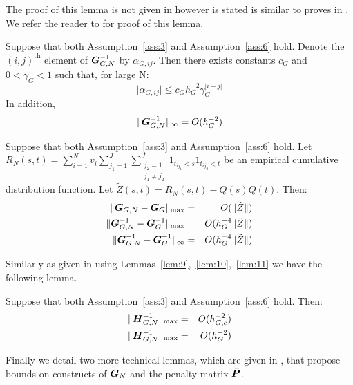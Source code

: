 The proof of this lemma is not given in \citep{xiao_asymptotic_2020} however is stated is similar to proves in \citep{xiao_asymptotic_2019}. 
We refer the reader to \citep{xiao_asymptotic_2019} for proof of this lemma. 
\begin{lemma}
	Suppose that both Assumption~\ref{ass:3} and Assumption~\ref{ass:6} hold.
	Denote the $(i,j)^\text{th}$ element of $\bm{{G}}_{G, N}^{-1}$ by $\alpha_{G, ij}$.
	Then there exists constants $c_G$ and $0 < \gamma_G < 1$ such that, for large N:
	\begin{equation}
		\lvert \alpha_{G, ij} \rvert \leq c_G h_{G}^{-2} \gamma_{G}^{\lvert i -j \rvert}
	\end{equation}
	In addition,
	\begin{equation}
		\lVert \bm{{G}}_{G, N}^{-1} \rVert_\infty = O(h_G^{-2})
	\end{equation}
	\label{lem:10}
\end{lemma}
\begin{lemma}
	Suppose that both Assumption~\ref{ass:3} and Assumption~\ref{ass:6} hold.
	Let $R_N(s,t) = \sum_{i=1}^N v_i  \sum_{j_1=1}^J \sum_{\substack{j_2=1 \\ j_1 \ne j_2}}^J 1_{t_{ij_1}< s} 1_{t_{ij_2} < t}$ be an empirical cumulative distribution function.
	Let $\tilde{Z}(s,t) = R_N(s,t) - Q(s)Q(t)$.
	Then:
	\begin{eqnarray}
		\lVert \bm{{G}}_{G,N} - \bm{{G}}_{G} \rVert_\text{max} &=& O(\lVert \tilde{Z} \rVert) \\
		\lVert \bm{{G}}_{G,N}^{-1} - \bm{{G}}_{G}^{-1} \rVert_\text{max} &=& O(h_G^{-4}\lVert \tilde{Z} \rVert) \\
		\lVert \bm{{G}}_{G,N}^{-1} - \bm{{G}}_{G}^{-1} \rVert_\infty &=& O(h_G^{-4}\lVert \tilde{Z} \rVert)
	\end{eqnarray}
	\label{lem:11} 
\end{lemma}
Similarly as given in \citep{xiao_asymptotic_2020} using Lemmas~\ref{lem:9},~\ref{lem:10},~\ref{lem:11} we have the following lemma.
\begin{lemma}
	Suppose that both Assumption~\ref{ass:3} and Assumption~\ref{ass:6} hold.
	Then:
	\begin{eqnarray}
		\lVert \bm{{H}}_{G, N}^{-1} \rVert_\text{max} &=& O(h_{G,e}^{-2}) \\
		\lVert \bm{{H}}_{G, N}^{-1} \rVert_\text{max} &=& O(h_{G}^{-2})
	\end{eqnarray}
	\label{lem:12}
\end{lemma}
Finally we detail two more technical lemmas, which are given in \citep{xiao_asymptotic_2020}, that propose bounds on constructs of $\bm{{G}}_{N}$ and the penalty matrix $\bm{{\bar{P}}}$.
